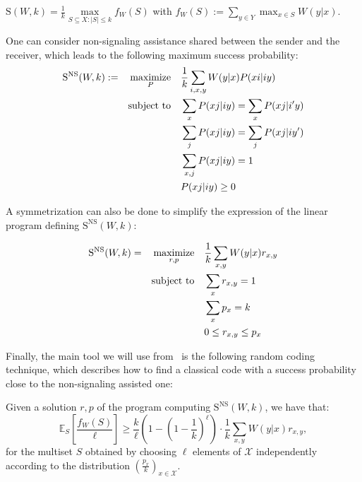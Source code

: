 \begin{proposition}
  $\mathrm{S}(W,k) = \frac{1}{k} \underset{S \subseteq X: |S| \leq k}{\max} f_W(S)$ with $f_W(S) := \sum_{y \in Y} \max_{x \in S} W(y|x)$.
\end{proposition}

One can consider non-signaling assistance shared between the sender and the receiver, which leads to the following maximum success probability:
\begin{equation}
  \begin{aligned}
    \mathrm{S}^{\mathrm{NS}}(W,k) := &&\underset{P}{\operatorname{\text{maximize}}} &&& \frac{1}{k} \sum_{i,x,y} W(y|x)P(xi|iy)\\
    &&\operatorname{\text{subject to}} &&& \sum_{x} P(xj|iy) = \sum_{x} P(xj|i'y)\\
    &&&&& \sum_{j} P(xj|iy) = \sum_{j} P(xj|iy')\\
    &&&&& \sum_{x,j} P(xj|iy) = 1\\
    &&&&& P(xj|iy) \geq 0
  \end{aligned}
\end{equation}

A symmetrization can also be done to simplify the expression of the linear program defining $\mathrm{S}^{\mathrm{NS}}(W,k)$:
\begin{proposition}
  \label{prop:NSonewayLP}
  \begin{equation}
    \begin{aligned}
      \mathrm{S}^{\mathrm{NS}}(W,k) = &&\underset{r,p}{\operatorname{\text{maximize}}} &&& \frac{1}{k} \sum_{x,y} W(y|x)r_{x,y}\\
      &&\operatorname{\text{subject to}} &&& \sum_{x} r_{x,y} = 1\\
      &&&&& \sum_{x} p_{x} = k\\
      &&&&& 0 \leq r_{x,y} \leq p_{x}
    \end{aligned}
  \end{equation}
\end{proposition}

Finally, the main tool we will use from~\cite{BF18} is the following random coding technique, which describes how to find a classical code with a success probability close to the non-signaling assisted one:
\begin{theorem}
  \label{theo:RandomCoding}
  Given a solution $r,p$ of the program computing $\mathrm{S}^{\mathrm{NS}}(W,k)$, we have that:
  \[ \mathbb{E}_S\left[\frac{f_W(S)}{\ell}\right] \geq \frac{k}{\ell}\left(1-\left(1-\frac{1}{k}\right)^{\ell}\right) \cdot \frac{1}{k} \sum_{x,y} W(y|x)r_{x,y} , \]
  for the multiset $S$ obtained by choosing $\ell$ elements of $\mathcal{X}$ independently according to the distribution $\left(\frac{p_{x}}{k}\right)_{x \in \mathcal{X}}$.
\end{theorem}
